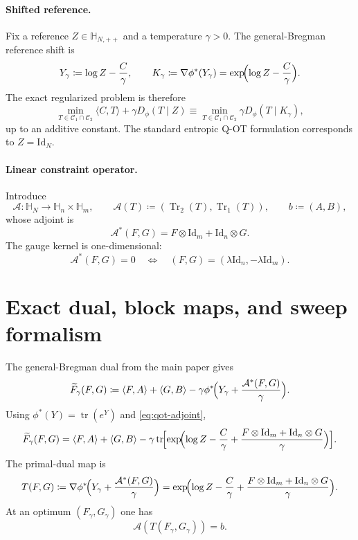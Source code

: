 \documentclass[11pt]{article}
\newcommand{\Id}{\mathrm{Id}}
\newcommand{\tr}{\operatorname{tr}}
\newcommand{\Trone}{\operatorname{Tr}_{1}}
\newcommand{\Trtwo}{\operatorname{Tr}_{2}}
\newcommand{\eqdef}{\coloneqq}
\newcommand{\dotp}[2]{\langle #1,#2\rangle}
\newcommand{\Hh}{\mathbb{H}}
\newcommand{\Cc}{\mathcal{C}}
\newcommand{\Aa}{\mathcal{A}}
\newcommand{\Ee}{\widetilde F}
\theoremstyle{plain}
\begin{document}
\paragraph{Shifted reference.}
Fix a reference $Z \in \Hh_{N,++}$ and a temperature $\gamma>0$.
The general-Bregman reference shift is
\[
Y_\gamma \eqdef \log Z - \frac{C}{\gamma},
\qquad
K_\gamma \eqdef \nabla \phi^\ast(Y_\gamma)=\exp\!\Bigl(\log Z-\frac{C}{\gamma}\Bigr).
\]
The exact regularized problem is therefore
\begin{equation}
\label{eq:qot-bregman-primal}
\min_{T \in \Cc_1 \cap \Cc_2}
\dotp{C}{T} + \gamma D_\phi(T \mid Z)
\equiv
\min_{T \in \Cc_1 \cap \Cc_2}
\gamma D_\phi(T \mid K_\gamma),
\end{equation}
up to an additive constant.
The standard entropic Q-OT formulation corresponds to $Z=\Id_N$.

\paragraph{Linear constraint operator.}
Introduce
\[
\Aa : \Hh_N \to \Hh_n \times \Hh_m,
\qquad
\Aa(T) \eqdef (\Trtwo(T),\Trone(T)),
\qquad
b \eqdef (A,B),
\]
whose adjoint is
\begin{equation}
\label{eq:qot-adjoint}
\Aa^\ast(F,G) = F \otimes \Id_m + \Id_n \otimes G.
\end{equation}
The gauge kernel is one-dimensional:
\begin{equation}
\label{eq:qot-gauge}
\Aa^\ast(F,G)=0
\quad\Longleftrightarrow\quad
(F,G)=(\lambda \Id_n,-\lambda \Id_m).
\end{equation}

\section{Exact dual, block maps, and sweep formalism}

The general-Bregman dual from the main paper gives
\begin{equation}
\label{eq:qot-general-dual}
\Ee_\gamma(F,G)
\eqdef
\dotp{F}{A} + \dotp{G}{B}
- \gamma \phi^\ast\!\Bigl(Y_\gamma + \frac{\Aa^\ast(F,G)}{\gamma}\Bigr).
\end{equation}
Using $\phi^\ast(Y)=\tr(e^Y)$ and \eqref{eq:qot-adjoint},
\begin{equation}
\label{eq:qot-dual-explicit}
\Ee_\gamma(F,G)
=
\dotp{F}{A} + \dotp{G}{B}
- \gamma \tr\!\Bigl[
\exp\!\Bigl(
\log Z - \frac{C}{\gamma} + \frac{F \otimes \Id_m + \Id_n \otimes G}{\gamma}
\Bigr)
\Bigr].
\end{equation}
The primal-dual map is
\begin{equation}
\label{eq:qot-primal-dual-map}
T(F,G)
\eqdef
\nabla \phi^\ast\!\Bigl(Y_\gamma + \frac{\Aa^\ast(F,G)}{\gamma}\Bigr)
=
\exp\!\Bigl(
\log Z - \frac{C}{\gamma} + \frac{F \otimes \Id_m + \Id_n \otimes G}{\gamma}
\Bigr).
\end{equation}
At an optimum $(F_\gamma,G_\gamma)$ one has
\[
\Aa(T(F_\gamma,G_\gamma))=b.
\]
\end{document}
